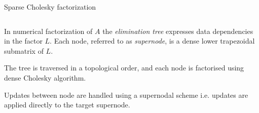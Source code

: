 \documentclass{beamer}
\newcommand{\db}[1]{\textcolor{mblue}{#1\xspace}}
\begin{document}
\begin{frame}{Sparse Cholesky factorization}
  
  \begin{columns}  

    \begin{column}{0.6\textwidth}  

      In numerical factorization of \alert{$A$} the
      \db{\textit{elimination tree}} expresses data dependencies in
      the factor \alert{$L$}. Each node, referred to as
      \db{\textit{supernode}}, is a \alert{dense} lower trapezoidal
      \alert{submatrix} of \alert{$L$}.

      \vspace{0.4cm}

      The tree is traversed in a \db{topological order}, and each node is
      factorised using \alert{dense Cholesky algorithm}.

      \vspace{0.4cm}
      
      Updates between node are handled using a \alert{supernodal scheme}
      i.e. updates are applied directly to the target supernode.
    \end{column}


\end{columns}
\end{frame}
\end{document}
